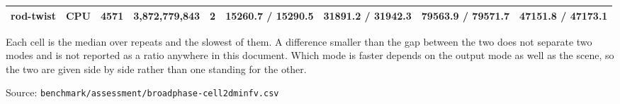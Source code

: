 \begin{table}[htbp]
{\begin{tabular}{llrrrrrrr}
    rod-twist & CPU & 4571 & 3,872,779,843 & 2 & 15260.7 / 15290.5 & 31891.2 / 31942.3 & 79563.9 / 79571.7 & 47151.8 / 47173.1 \\
    \bottomrule
  \end{tabular}}
  \par\smallskip\footnotesize Each cell is the median over repeats and the slowest of them. A difference smaller than the gap between the two does not separate two modes and is not reported as a ratio anywhere in this document. Which mode is faster depends on the output mode as well as the scene, so the two are given side by side rather than one standing for the other.
  \par\smallskip\footnotesize Source: \texttt{benchmark/assessment/broadphase-cell2dminfv.csv}
\end{table}
